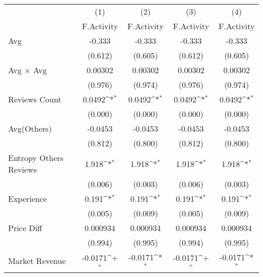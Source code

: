 {
\def\sym#1{\ifmmode^{#1}\else\(^{#1}\)\fi}
\begin{tabular}{l*{4}{c}}
\hline\hline
                    &\multicolumn{1}{c}{(1)}&\multicolumn{1}{c}{(2)}&\multicolumn{1}{c}{(3)}&\multicolumn{1}{c}{(4)}\\
                    &\multicolumn{1}{c}{F.Activity}&\multicolumn{1}{c}{F.Activity}&\multicolumn{1}{c}{F.Activity}&\multicolumn{1}{c}{F.Activity}\\
\hline
Avg                 &      -0.333       &      -0.333       &      -0.333       &      -0.333       \\
                    &     (0.612)       &     (0.605)       &     (0.612)       &     (0.605)       \\
[1em]
Avg $\times$ Avg    &     0.00302       &     0.00302       &     0.00302       &     0.00302       \\
                    &     (0.976)       &     (0.974)       &     (0.976)       &     (0.974)       \\
[1em]
Reviews Count       &      0.0492\sym{*}&      0.0492\sym{*}&      0.0492\sym{*}&      0.0492\sym{*}\\
                    &     (0.000)       &     (0.000)       &     (0.000)       &     (0.000)       \\
[1em]
Avg(Others)         &     -0.0453       &     -0.0453       &     -0.0453       &     -0.0453       \\
                    &     (0.812)       &     (0.800)       &     (0.812)       &     (0.800)       \\
[1em]
Entropy Others Reviews&       1.918\sym{*}&       1.918\sym{*}&       1.918\sym{*}&       1.918\sym{*}\\
                    &     (0.006)       &     (0.003)       &     (0.006)       &     (0.003)       \\
[1em]
Experience          &       0.191\sym{*}&       0.191\sym{*}&       0.191\sym{*}&       0.191\sym{*}\\
                    &     (0.005)       &     (0.009)       &     (0.005)       &     (0.009)       \\
[1em]
Price Diff          &    0.000934       &    0.000934       &    0.000934       &    0.000934       \\
                    &     (0.994)       &     (0.995)       &     (0.994)       &     (0.995)       \\
[1em]
Market Revenue      &     -0.0171\sym{+}&     -0.0171\sym{*}&     -0.0171\sym{+}&     -0.0171\sym{*}\\

\end{tabular}}
